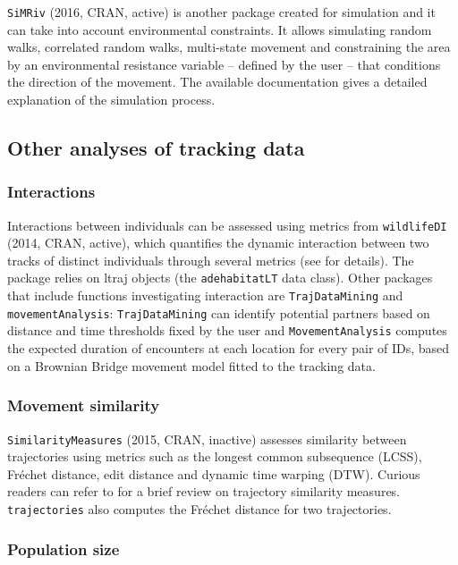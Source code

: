 \documentclass[a4paper,12pt]{article}
\newcommand{\Rpkg}[1]{\texttt{#1}}
\begin{document}
\Rpkg{SiMRiv} (2016, CRAN, active) is another package created for simulation and it can take into account environmental constraints. It allows simulating random walks, correlated random walks, multi-state movement and constraining the area by an environmental resistance variable -- defined by the user -- that conditions the direction of the movement. The available documentation gives a detailed explanation of the simulation process. 

\subsection*{Other analyses of tracking data}

\subsubsection*{Interactions}

Interactions between individuals can be assessed using metrics from \Rpkg{wildlifeDI} (2014, CRAN, active), which quantifies the dynamic interaction between two tracks of distinct individuals through several metrics (see \cite{Long2014} for details). The package relies on ltraj objects (the \Rpkg{adehabitatLT} data class). Other packages that include functions investigating interaction are \Rpkg{TrajDataMining} and \Rpkg{movementAnalysis}: \Rpkg{TrajDataMining} can identify potential partners based on distance and time thresholds fixed by the user and \Rpkg{MovementAnalysis} computes the expected duration of encounters at each location for every pair of IDs, based on a Brownian Bridge movement model fitted to the tracking data. 

\subsubsection*{Movement similarity}

\Rpkg{SimilarityMeasures} (2015, CRAN, inactive) assesses similarity between trajectories using metrics such as the longest common subsequence (LCSS), Fr\'echet distance, edit distance and dynamic time warping (DTW). Curious readers can refer to \cite{Magdy2015} for a brief review on trajectory similarity measures. \Rpkg{trajectories} also computes the Fr\'echet distance for two trajectories. 

\subsubsection*{Population size}
\end{document}
